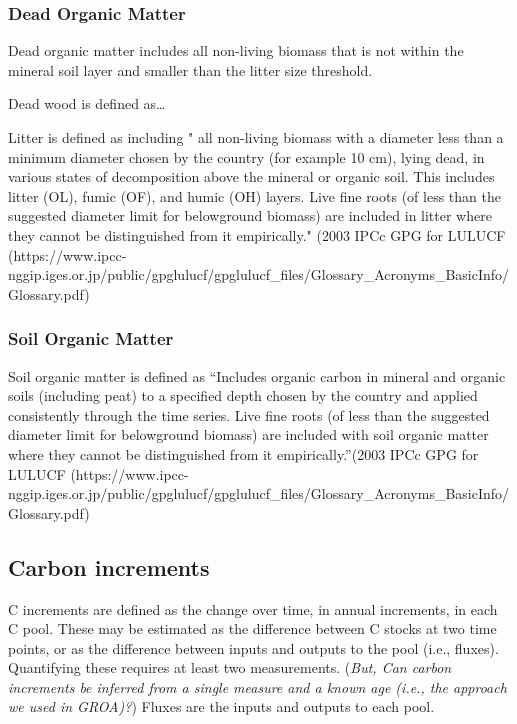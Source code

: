 \documentclass[, manuscript]{copernicus}
\begin{document}
\subsubsection{Dead Organic Matter}

Dead organic matter includes all non-living biomass that is not within
the mineral soil layer and smaller than the litter size threshold.

Dead wood is defined as\ldots{}

Litter is defined as including " all non-living biomass with a diameter
less than a minimum diameter chosen by the country (for example 10 cm),
lying dead, in various states of decomposition above the mineral or
organic soil. This includes litter (OL), fumic (OF), and humic (OH)
layers. Live fine roots (of less than the suggested diameter limit for
belowground biomass) are included in litter where they cannot be
distinguished from it empirically." (2003 IPCc GPG for LULUCF
(https://www.ipcc-nggip.iges.or.jp/public/gpglulucf/gpglulucf\_files/Glossary\_Acronyms\_BasicInfo/Glossary.pdf)

\subsubsection{Soil Organic Matter}

Soil organic matter is defined as ``Includes organic carbon in mineral
and organic soils (including peat) to a specified depth chosen by the
country and applied consistently through the time series. Live fine
roots (of less than the suggested diameter limit for belowground
biomass) are included with soil organic matter where they cannot be
distinguished from it empirically.''(2003 IPCc GPG for LULUCF
(https://www.ipcc-nggip.iges.or.jp/public/gpglulucf/gpglulucf\_files/Glossary\_Acronyms\_BasicInfo/Glossary.pdf)

\subsection{Carbon increments}

C increments are defined as the change over time, in annual increments,
in each C pool. These may be estimated as the difference between C
stocks at two time points, or as the difference between inputs and
outputs to the pool (i.e., fluxes). Quantifying these requires at least
two measurements. (\emph{But, Can carbon increments be inferred from a
single measure and a known age (i.e., the approach we used in GROA)?})
Fluxes are the inputs and outputs to each pool.
\end{document}
